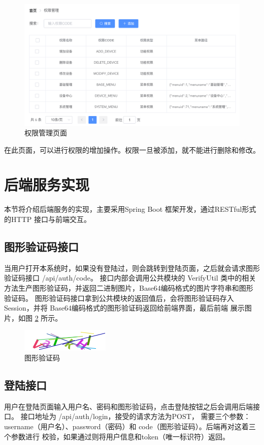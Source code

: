 \begin{figure}[ht]
    \centering
    \includegraphics[width=1\linewidth]{./Figure/IMG_permission.png}
    \caption{权限管理页面}\label{Fig:permission}
\end{figure}

在此页面，可以进行权限的增加操作。权限一旦被添加，就不能进行删除和修改。

\section{后端服务实现}
本节将介绍后端服务的实现，主要采用Spring Boot 框架开发，通过RESTful形式的HTTP 接口与前端交互。
\subsection{图形验证码接口}


当用户打开本系统时，如果没有登陆过，则会跳转到登陆页面，之后就会请求图形验证码接口 /api/auth/code。
接口内部会调用公共模块的 VerifyUtil 类中的相关方法生产图形验证码，并返回二进制图片，Base64编码格式的图片字符串和图形验证码。
图形验证码接口拿到公共模块的返回值后，会将图形验证码存入Session，并将 Base64编码格式的图形验证码返回给前端界面，最后前端
展示图片，如图 \ref{Fig:code_eg} 所示。

\begin{figure}[ht]
    \centering
    \includegraphics[width=0.5\linewidth]{./Figure/IMG_code.png}
    \caption{图形验证码}\label{Fig:code_eg}
\end{figure}

\subsection{登陆接口}
用户在登陆页面输入用户名、密码和图形验证码，点击登陆按钮之后会调用后端接口。
接口地址为 /api/auth/login，接受的请求方法为POST，
需要三个参数：username（用户名）、password（密码）和 code（图形验证码）。后端再对这着三个参数进行
校验，如果通过则将用户信息和token（唯一标识符）返回。

